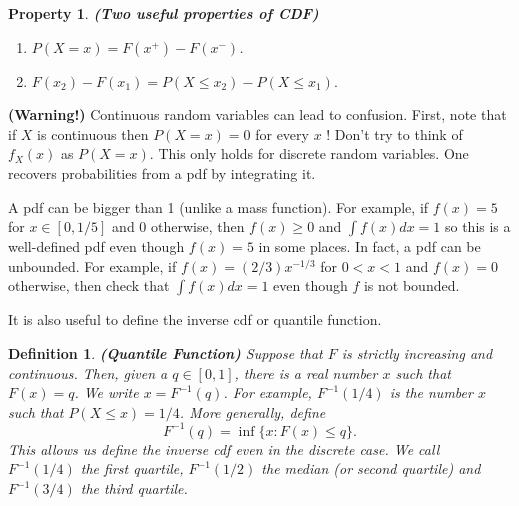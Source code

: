 \documentclass[13pt]{article}
\newtheorem{property}[theorem]{Property}
\newtheorem{definition}[theorem]{Definition}
\theoremstyle{definition}
\theoremstyle{remark}
\newenvironment{remark}
  {\pushQED{\qed}\renewcommand{\qedsymbol}{$\triangle$}\remarkx}
  {\popQED\endremarkx}
\begin{document}
\begin{property}\textbf{(Two useful properties of CDF)}
\begin{enumerate}[label=(\alph*)]
    \item $P(X=x)=F\left(x^{+}\right)-F\left(x^{-}\right)$.
    \item $F\left(x_{2}\right)-F\left(x_{1}\right)=P\left(X \leq x_{2}\right)-P\left(X \leq x_{1}\right).$
\end{enumerate}
\end{property}

\begin{remark}
    \textbf{(Warning!)} Continuous random variables can lead to confusion. First, note that if $X$ is continuous then $P(X=x)=0$ for every $x$ ! Don't try to think of $f_X(x)$ as $P(X=x)$. This only holds for discrete random variables. One recovers probabilities from a pdf by integrating it. 
    
    A pdf can be bigger than 1 (unlike a mass function). For example, if $f(x)=5$ for $x \in[0,1 / 5]$ and 0 otherwise, then $f(x) \geq 0$ and $\int f(x) d x=1$ so this is a well-defined pdf even though $f(x)=5$ in some places. In fact, a pdf can be unbounded. For example, if $f(x)=(2 / 3) x^{-1 / 3}$ for $0<x<1$ and $f(x)=0$ otherwise, then check that $\int f(x) d x=1$ even though $f$ is not bounded.
\end{remark}

It is also useful to define the inverse cdf or quantile function. 
\begin{definition}\textbf{(Quantile Function)} Suppose that $F$ is strictly increasing and continuous. Then, given a $q \in[0,1]$, there is a real number $x$ such that $F(x)=q$. We write $x=F^{-1}(q)$. For example, $F^{-1}(1 / 4)$ is the number $x$ such that $P(X \leq x)=1 / 4$. More generally, define 
\[
F^{-1}(q)=\inf \{x: F(x) \leq q\}.
\]
This allows us define the inverse cdf even in the discrete case. We call $F^{-1}(1 / 4)$ the first quartile, $F^{-1}(1 / 2)$ the median (or second quartile) and $F^{-1}(3 / 4)$ the third quartile.
\end{definition}
\end{document}
